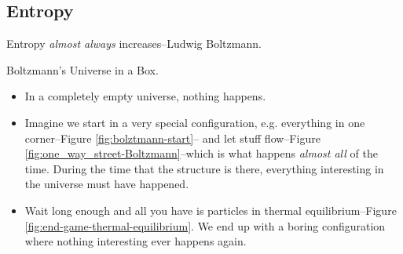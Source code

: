 \documentclass[]{article}
\begin{document}
\subsection{Entropy}
Entropy \emph{almost always} increases--Ludwig Boltzmann.

Boltzmann's Universe in a Box.
\begin{itemize}
	\item  In a completely empty universe, nothing happens.
	\item Imagine we start in a very special configuration, e.g. everything in one corner--Figure \ref{fig:bolztmann-start}-- and let stuff flow--Figure \ref{fig:one_way_street-Boltzmann}--which is what happens \emph{almost all} of the time. During the time that the structure is there, everything interesting in the universe must have happened.
	\item Wait long enough and all you have is particles in thermal equilibrium--Figure \ref{fig:end-game-thermal-equilibrium}. We end up with a boring configuration where nothing interesting ever happens again.
\end{itemize}
\end{document}
